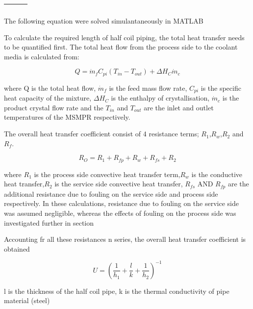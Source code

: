\begin{table}
\begin{tabularx}{\linewidth}{lXX}
\begin{itemize}[label=-,leftmargin=1em]
\end{itemize}
\\\bottomrule
\end{tabularx}
\end{table}

The following equation were solved simulantaneously in MATLAB 


To calculate the required length of half coil piping, the total heat transfer needs to be quantified first. The total heat flow from the process side to the coolant media is calculated from:

\begin{equation} \label{eq:energy balance}
    Q =  \Dot{m}_{f}C_{pi}(T_{in}-T_{out})+ \Delta H_{C}\Dot{m}_{c}
\end{equation}

\noindent where Q is the total heat flow, $\Dot{m}_f$ is the feed mass flow rate, $C_{pi}$ is the specific heat capacity of the mixture, $\Delta H_{C}$ is the enthalpy of crystallisation, $\Dot{m}_{c}$ is the product crystal flow rate and the $T_{in}$ and $T_{out}$ are the inlet and outlet temperatures of the MSMPR respectively.


The overall heat transfer coefficient consist of 4 resistance terms; $R_1$,$R_w$,$R_2$ and $R_f$.

\begin{equation} \label{eq:resistht}
    R_O = R_1 + R_{fp} + R_w + R_{fs} + R_2
\end{equation}

where $R_1$ is the process side convective heat transfer term,$R_w$ is the conductive heat transfer,$R_2$ is the service side convective heat transfer, $R_{fs}$ AND $R_{fp}$ are the additional resistance due to fouling on the service side and process side respectively. In these calculations, resistance due to fouling on the service side was assumed negligible, whereas the effects of fouling on the process side was investigated further in section %

Accounting fr all these resistances n series, the overall heat transfer coefficient is obtained  

\begin{equation} \label{eq:energy balance}
    U = \left(\frac{1}{h_1} + \frac{l}{k}   + \frac{1}{h_2 } \right)^{-1}
\end{equation}

l is the thickness of the half coil pipe, k is the thermal conductivity of pipe material (steel)


